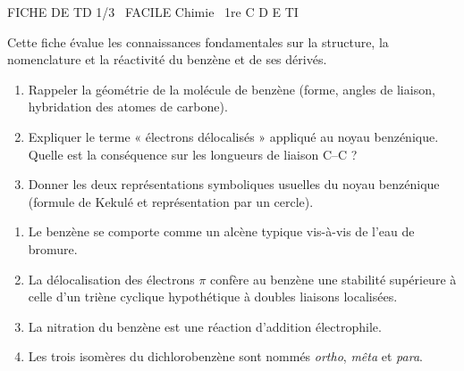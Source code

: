 \documentclass[11pt]{article}
\begin{document}
\begin{tcolorbox}[enhanced,colback=popink,colframe=popink,arc=10pt,boxrule=0pt,left=12pt,right=12pt,top=9pt,bottom=9pt]
{\color{white}\popxbold\small FICHE DE TD 1/3 \textbullet\ FACILE \hfill Chimie \textbullet\ 1re C D E TI\par}
\end{tcolorbox}
\vspace{4pt}
Cette fiche évalue les connaissances fondamentales sur la structure, la nomenclature et la réactivité du benzène et de ses dérivés.

\begin{exercice}
\begin{enumerate}
    \item Rappeler la géométrie de la molécule de benzène (forme, angles de liaison, hybridation des atomes de carbone).
    \item Expliquer le terme « électrons délocalisés » appliqué au noyau benzénique. Quelle est la conséquence sur les longueurs de liaison C--C ?
    \item Donner les deux représentations symboliques usuelles du noyau benzénique (formule de Kekulé et représentation par un cercle).
\end{enumerate}
\end{exercice}

\begin{exercice}
\begin{enumerate}
    \item Le benzène se comporte comme un alcène typique vis-à-vis de l'eau de bromure.
    \item La délocalisation des électrons $\pi$ confère au benzène une stabilité supérieure à celle d'un triène cyclique hypothétique à doubles liaisons localisées.
    \item La nitration du benzène est une réaction d'addition électrophile.
    \item Les trois isomères du dichlorobenzène sont nommés \textit{ortho}, \textit{mêta} et \textit{para}.
\end{enumerate}
\end{exercice}
\end{document}
